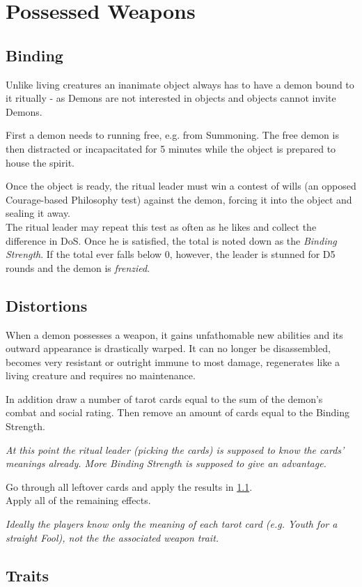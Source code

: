\section{Possessed Weapons}
\label{sec:possessedweapon}
\subsection*{Binding}
Unlike living creatures an inanimate object always has to have a demon bound to it ritually
- as Demons are not interested in objects and objects cannot invite Demons.
\par
First a demon needs to running free, e.g. from Summoning.
The free demon is then distracted or incapacitated for 5 minutes while the object is prepared to house the spirit.
\par
Once the object is ready, the ritual leader must win a contest of wills
	(an opposed Courage-based Philosophy test)
	against the demon, forcing it into the object and sealing it away.
\\%
The ritual leader may repeat this test as often as he likes and collect the difference in DoS.
Once he is satisfied, the total is noted down as the \emph{Binding Strength}.
If the total ever falls below 0, however,
	the leader is stunned for D5 rounds
	and the demon is \emph{frenzied}.

\subsection*{Distortions}
When a demon possesses a weapon, it gains unfathomable new abilities and its outward appearance is drastically warped.
It can no longer be disassembled, becomes very resistant or outright immune to most damage, regenerates like a living creature and requires no maintenance.
\par
In addition draw a number of tarot cards equal to
	the sum of the demon's combat and social rating.
Then remove an amount of cards equal to the Binding Strength.
\begin{exampleblock}
	\itshape
	At this point the ritual leader (picking the cards) is supposed to know the cards' meanings already.
	More Binding Strength is supposed to give an advantage.
\end{exampleblock}
Go through all leftover cards and apply the results in \ref{sec:traits}.
\\%
Apply all of the remaining effects.
\begin{exampleblock}
	\itshape
	Ideally the players know only the meaning of each tarot card
	(e.g. \emph{Youth} for a straight Fool),
	not the the associated weapon trait.
\end{exampleblock}

\subsection{Traits}
\label{sec:traits}
